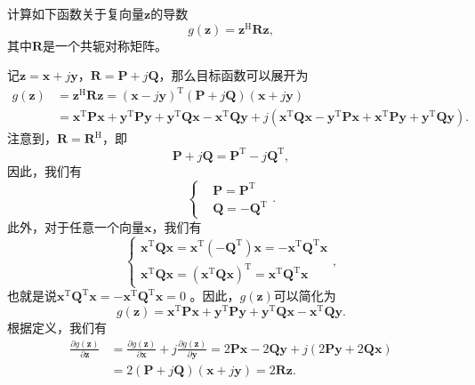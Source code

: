 \begin{example}
    计算如下函数关于复向量\( \bm{z} \)的导数
    \[
        g(\bm{z}) = \bm{z}^{\mathrm{H}} \mathbf{R} \bm{z},
    \]
    其中\( \mathbf{R} \)是一个共轭对称矩阵。
\end{example}
\begin{solution}
    记\( \bm{z} = \bm{x} + j \bm{y} \)，\( \mathbf{R} = \mathbf{P} + j \mathbf{Q} \)，那么目标函数可以展开为
    \[
        \begin{split}
            g(\bm{z}) & = \bm{z}^{\mathrm{H}} \mathbf{R} \bm{z} = (\bm{x} - j \bm{y})^{\mathrm{T}}(\mathbf{P} + j \mathbf{Q})(\bm{x} + j \bm{y})                                                                                                                                                                                                                 \\
                      & = \bm{x}^{\mathrm{T}} \mathbf{P} \bm{x} + \bm{y}^{\mathrm{T}} \mathbf{P} \bm{y} + \bm{y}^{\mathrm{T}} \mathbf{Q} \mathbf{x} - \bm{x}^{\mathrm{T}} \mathbf{Q} \bm{y} + j (\bm{x}^{\mathrm{T}} \mathbf{Q} \bm{x} - \bm{y}^{\mathrm{T}} \mathbf{P} \bm{x} + \bm{x}^{\mathrm{T}} \mathbf{P} \bm{y} + \bm{y}^{\mathrm{T}} \mathbf{Q} \bm{y}).
        \end{split}
    \]
    注意到，\( \mathbf{R} = \mathbf{R}^{\mathrm{H}} \)，即
    \[
        \mathbf{P} + j \mathbf{Q} = \mathbf{P}^{\mathrm{T}} - j\mathbf{Q}^{\mathrm{T}},
    \]
    因此，我们有
    \[
        \begin{cases}
             & \mathbf{P} = \mathbf{P}^{\mathrm{T}}   \\
             & \mathbf{Q} = - \mathbf{Q}^{\mathrm{T}}
        \end{cases}.
    \]
    此外，对于任意一个向量\( \bm{x} \)，我们有
    \[
        \begin{cases}
            \bm{x}^{\mathrm{T}} \mathbf{Q} \bm{x} = \bm{x}^{\mathrm{T}} ( - \mathbf{Q}^{\mathrm{T}}) \bm{x} = - \bm{x}^{\mathrm{T}} \mathbf{Q}^{\mathrm{T}} \bm{x} \\
            \bm{x}^{\mathrm{T}} \mathbf{Q} \bm{x} = (\bm{x}^{\mathrm{T}} \mathbf{Q} \bm{x})^{\mathrm{T}} = \bm{x}^{\mathrm{T}} \mathbf{Q}^{\mathrm{T}} \bm{x}
        \end{cases},
    \]
    也就是说\( \bm{x}^{\mathrm{T}} \mathbf{Q}^{\mathrm{T}} \bm{x} =  - \bm{x}^{\mathrm{T}} \mathbf{Q}^{\mathrm{T}} \bm{x} = 0\) 。因此，\( g(\bm{z}) \)可以简化为
    \[
        g(\bm{z}) = \bm{x}^{\mathrm{T}} \mathbf{P} \bm{x} + \bm{y}^{\mathrm{T}} \mathbf{P} \bm{y} + \bm{y}^{\mathrm{T}} \mathbf{Q} \mathbf{x} - \bm{x}^{\mathrm{T}} \mathbf{Q} \bm{y}.
    \]
    根据定义，我们有
    \[
        \begin{split}
            \frac{\partial g(\bm{z})}{\partial \bm{z}} & = \frac{\partial g(\bm{z})}{\partial \bm{x}} + j \frac{\partial g(\bm{z})}{\partial \bm{y}} = 2\mathbf{P}\bm{x} - 2 \mathbf{Q} \bm{y} + j(2 \mathbf{P} \bm{y} + 2\mathbf{Q} \bm{x}) \\
                                                       & = 2(\mathbf{P} + j \mathbf{Q}) (\bm{x} + j \bm{y}) = 2\mathbf{R} \mathbf{z}.
        \end{split}
    \]
\end{solution}

